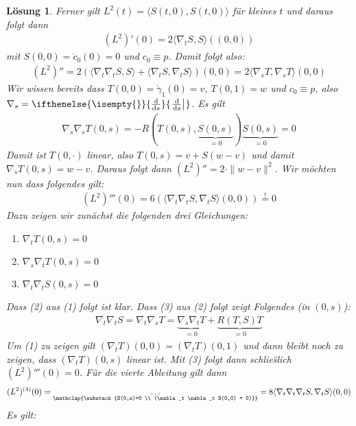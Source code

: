 \documentclass[paper=A4, twoside, chapterprefix=true, bibliography=totoc, headsepline]{scrbook}
\newcommand{\dop}{\mathrm{d}}
\newcommand{\difffrac}[3][]{\ifthenelse{\isempty{#1}}{\frac{\dop #2}{\dop #3}}{\left. \frac{\dop #2}{\dop #3} \right|_{#1}}}
\theoremstyle{plain}
\theoremstyle{nonumberplain}
\theoremstyle{empty}
\theoremstyle{break}
\newtheorem{Loes}{L\"osung}
\begin{document}
\begin{Loes}
Ferner gilt $L^2(t) = \langle S(t,0), S(t,0) \rangle$ f\"ur kleines $t$ und daraus folgt dann
\begin{align*}
	(L^2)'(0) = 2 \langle \nabla_t S, S \rangle ((0,0))
\end{align*}
mit $S(0,0) = \dot c_0(0) = 0$ und $c_0 \equiv p$. Damit folgt also:
\begin{align*}
	(L^2)'' = 2 ( \langle \nabla_t \nabla_t S, S \rangle + \langle \nabla_t S, \nabla_t S \rangle ) (0,0) = 2 \langle \nabla_s T, \nabla_s T \rangle (0,0)
\end{align*}
Wir wissen bereits dass $T(0,0) = \dot\gamma_1(0) = v$, $T(0,1) = w$ und $c_0 \equiv p$, also $\nabla_s = \difffrac{}{s}$. Es gilt
\begin{align*}
	\nabla_s \nabla_s T(0,s) = -R ( T(0,s), \underbrace{S(0, s)}_{=0} ) \underbrace{S(0,s)}_{=0} = 0
\end{align*}
Damit ist $T(0,\cdot)$ linear, also $T(0,s) = v + S(w - v)$ und damit $\nabla_s T(0,s) = w - v$.
Daraus folgt dann $(L^2)'' = 2 \cdot \|w - v\|^2$.
Wir m\"ochten nun dass folgendes gilt:
\begin{align*}
	(L^2)'''(0) = 6 ( \langle \nabla_t \nabla_t S, \nabla_t S \rangle (0,0) ) \overset{!}{=} 0
\end{align*}
Dazu zeigen wir zun\"achst die folgenden drei Gleichungen:\begin{enumerate}[label=(\arabic*)]
	\item $\nabla_t T(0,s) = 0$
	\item $\nabla_s \nabla_t T(0,s) = 0$
	\item $\nabla_t \nabla_t S(0,s) = 0$
\end{enumerate}
Dass (2) aus (1) folgt ist klar. Dass (3) aus (2) folgt zeigt Folgendes (in $(0,s)$):
\begin{align*}
	\nabla_t \nabla_t S = \nabla_t \nabla_s T = \underbrace{\nabla_s \nabla_t T}_{=0} + \underbrace{R(T,S)T}_{=0}
\end{align*}
Um (1) zu zeigen gilt $(\nabla_t T)(0,0) = (\nabla_t T)(0,1)$ und dann bleibt noch zu zeigen, dass $(\nabla_t T)(0,s)$ linear ist.
Mit (3) folgt dann schlie\"slich $(L^2)'''(0) = 0$.
F\"ur die vierte Ableitung gilt dann
\begin{align*}
	(L^2)^{(4)}(0) = \underset{\mathclap{\substack{S(0,s)=0 \\ (\nabla_t \nabla_t S(0,0) = 0)}}}{\ldots} = 8 \langle \nabla_t\nabla_t\nabla_t S, \nabla_t S \rangle (0,0)
\end{align*}
Es gilt:
\begin{align*}

\end{align*}
\end{Loes}
\end{document}
